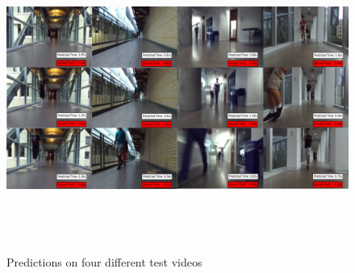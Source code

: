     \begin{figure}[ht]
      \centering
      \includegraphics[height=10cm,width=\linewidth]{figs/qr2.pdf}
      \caption{Predictions on four different test videos}
      \label{fig:testVideos}
  \end{figure}


